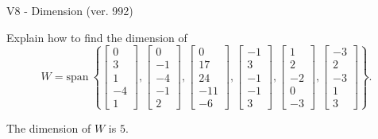 \begin{exercise}
  \begin{exerciseTitle}V8 - Dimension (ver. 992)\end{exerciseTitle}
  \begin{exerciseStatement}
    Explain how to find the dimension of 
\[W=\mathrm{span}\ \left\{\left[\begin{array}{r}
0 \\
3 \\
1 \\
-4 \\
1
\end{array}\right] , \left[\begin{array}{r}
0 \\
-1 \\
-4 \\
-1 \\
2
\end{array}\right] , \left[\begin{array}{r}
0 \\
17 \\
24 \\
-11 \\
-6
\end{array}\right] , \left[\begin{array}{r}
-1 \\
3 \\
-1 \\
-1 \\
3
\end{array}\right] , \left[\begin{array}{r}
1 \\
2 \\
-2 \\
0 \\
-3
\end{array}\right] , \left[\begin{array}{r}
-3 \\
2 \\
-3 \\
1 \\
3
\end{array}\right]\right\}.\]



  \end{exerciseStatement}
  \begin{exerciseAnswer}
   The dimension of \(W\) is  \(5\).
  


  \end{exerciseAnswer}
\end{exercise}